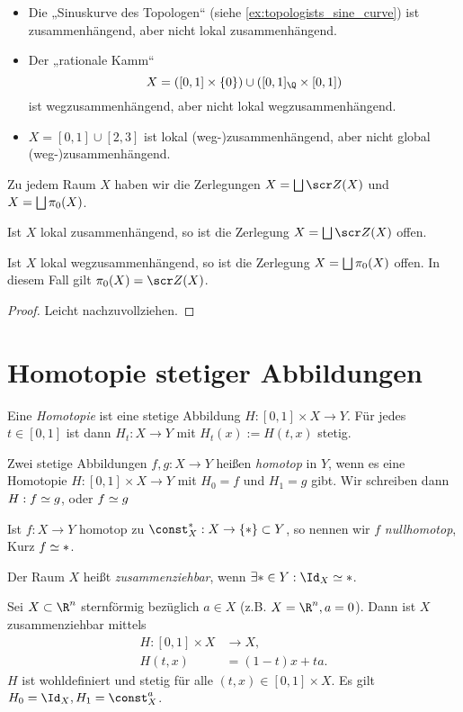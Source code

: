 \begin{ex}
	\begin{itemize}
		\item
			Die „Sinuskurve des Topologen“ (siehe \ref{ex:topologists_sine_curve}) ist zusammenhängend, aber nicht lokal zusammenhängend.
		\item
			Der „rationale Kamm“
			\[
				X = ([0,1] \times \{0\}) \cup ([0,1]_\Q \times [0,1])
			\]
			ist wegzusammenhängend, aber nicht lokal wegzusammenhängend.
		\item
			$X = [0,1] \cup [2,3]$ ist lokal (weg-)zusammenhängend, aber nicht global (weg-)zusammenhängend.
	\end{itemize}
\end{ex}

Zu jedem Raum $X$ haben wir die Zerlegungen $X = \bigdunion \scr Z(X)$ und $X = \bigsqcup \pi_0(X)$.

\begin{st}
	Ist $X$ lokal zusammenhängend, so ist die Zerlegung $X = \bigdunion \scr Z(X)$ offen.

	Ist $X$ lokal wegzusammenhängend, so ist die Zerlegung $X = \bigsqcup \pi_0(X)$ offen.
	In diesem Fall gilt $\pi_0(X) = \scr Z(X)$.
	\begin{proof}
		Leicht nachzuvollziehen.
	\end{proof}
\end{st}


\section{Homotopie stetiger Abbildungen}


\begin{df}
	Eine \emph{Homotopie} ist eine stetige Abbildung $H: [0,1] \times X \to Y$.
	Für jedes $t \in [0,1]$ ist dann $H_t: X \to Y$ mit $H_t(x) := H(t,x)$ stetig.

	Zwei stetige Abbildungen $f,g : X \to Y$ heißen \emph{homotop} in $Y$, wenn es eine Homotopie $H: [0,1] \times X \to Y$ mit $H_0 = f$ und $H_1 = g$ gibt.
	Wir schreiben dann $H: f \simeq g$, oder $f\simeq g$

	Ist $f: X \to  Y$ homotop zu $\const_X^{\ast}: X \to \{\ast\} \subset Y$, so nennen wir $f$ \emph{nullhomotop}, Kurz $f \simeq \ast$.

	Der Raum $X$ heißt \emph{zusammenziehbar}, wenn $\exists * \in Y: \Id_X \homotopic \ast$.
\end{df}

\begin{ex} \label{st:starlike_contractible}
	Sei $X \subset \R^n$ sternförmig bezüglich $a \in X$ (z.B. $X = \R^n, a = 0$).
	Dann ist $X$ zusammenziehbar mittels
	\begin{align*}
		H: [0,1] \times X &\to X, \\
		H(t,x) &= (1-t)x + ta.
	\end{align*}
	$H$ ist wohldefiniert und stetig für alle $(t,x) \in [0,1] \times X$.
	Es gilt $H_0 = \Id_X, H_1 = \const_X^{a}$.
\end{ex}

